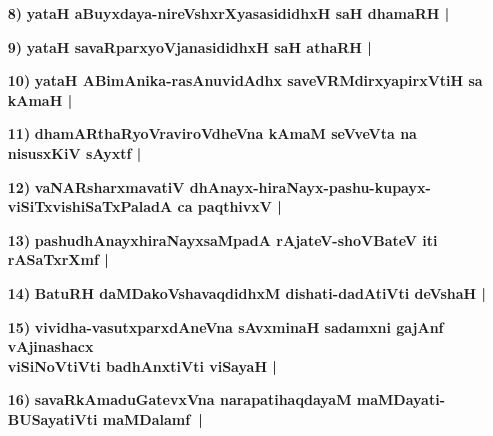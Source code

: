 \begin{itemize}
\item [\bf 8)] {\bf yataH aBuyxdaya-nireVshxrXyasasididhxH saH dhamaRH |}\label{94g}
\item [\bf 9)] {\bf yataH savaRparxyoVjanasididhxH saH athaRH |}\label{94h}
\item [\bf 10)] {\bf yataH ABimAnika-rasAnuvidAdhx saveVRMdirxyapirxVtiH sa kAmaH |}\label{94i}
\item [\bf 11)] {\bf dhamARthaRyoVraviroVdheVna kAmaM seVveVta na nisusxKiV sAyxtf |}\label{95}
\item [\bf 12)] {\bf vaNARsharxmavatiV dhAnayx-hiraNayx-pashu-kupayx-viSiTxvishiSaTxPaladA ca paqthivxV |}\label{95a}
\item [\bf 13)] {\bf pashudhAnayxhiraNayxsaMpadA rAjateV-shoVBateV iti rASaTxrXmf |}\label{95b}
\item [\bf 14)] {\bf BatuRH daMDakoVshavaqdidhxM dishati-dadAtiVti deVshaH |}\label{95c}
\item [\bf 15)] {\bf vividha-vasutxparxdAneVna sAvxminaH sadamxni gajAnf vAjinashacx}\\ {\bf viSiNoVtiVti badhAnxtiVti viSayaH |}
\item [\bf 16)] {\bf savaRkAmaduGatevxVna narapatihaqdayaM maMDayati-BUSayatiVti maMDalamf~|}\label{95d}


\end{itemize}
